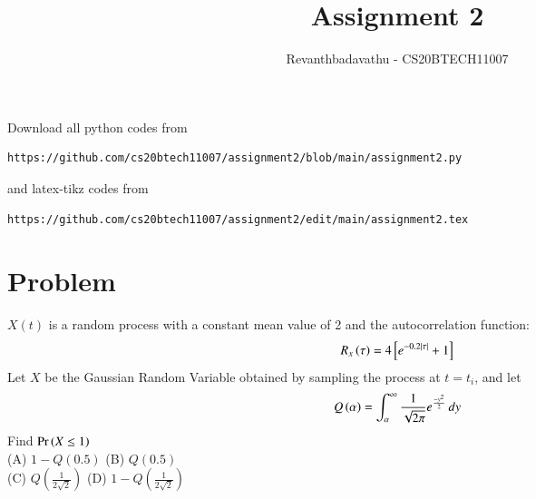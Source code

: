 \documentclass[journal,12pt,twocolumn]{IEEEtran}
\begin{document}
     \def\topbox#1{\raisebox{-\baselineskip}[0in][0in]{#1}}
     \def\midbox#1{\raisebox{-0.5\baselineskip}[0in][0in]{#1}}
\vspace{3cm}
\title{Assignment 2}
\author{Revanthbadavathu - CS20BTECH11007}
\maketitle
\newpage
\bigskip
\renewcommand{\thefigure}{\theenumi}
\renewcommand{\thetable}{\theenumi}
Download all python codes from 
\begin{lstlisting}
https://github.com/cs20btech11007/assignment2/blob/main/assignment2.py
\end{lstlisting}
%
and latex-tikz codes from 
%
\begin{lstlisting}
https://github.com/cs20btech11007/assignment2/edit/main/assignment2.tex
\end{lstlisting}
\section{Problem}
$X(t)$ is a random process with a constant mean value of 2 and the autocorrelation function:
\begin{align}
    R_x\left(\tau\right) = 4{}\left[e^{-0.2|\tau|} + 1\right]
    \end{align}
    \label{autocorrelation}
Let $X$ be the Gaussian Random Variable obtained by sampling the process at $t = t_i$, and let 
\begin{align}
    Q\left(\alpha\right) = \int_{\alpha}^{\infty} \frac{1}{\sqrt{2\pi}} e^{\frac{-y^2}{2}}\,dy
    \label{Q}
\end{align}
Find $\Pr\left(X \leq 1\right)$\\
(A) \(1 - Q(0.5)\) \hspace{1cm}
(B) \(Q(0.5)\) \\
(C) \(Q(\frac{1}{2\sqrt{2}})\) \hspace{1.6cm}
(D) \(1 - Q(\frac{1}{2\sqrt{2}})\)\\
\end{document}
